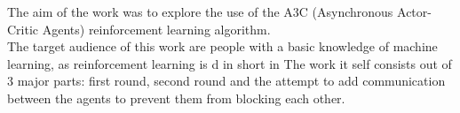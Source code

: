 The aim of the work was to explore the use of the A3C (Asynchronous Actor-Critic Agents) reinforcement learning algorithm.\\
The target audience of this work are people with a basic knowledge of machine learning, as reinforcement learning is d in short in %
The work it self consists out of 3 major parts: first round, second round and the attempt to add communication between the agents to prevent them from blocking each other. \\




